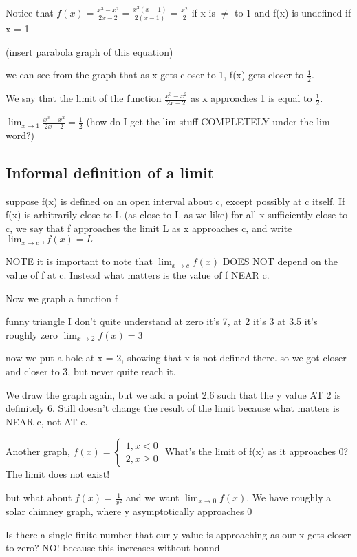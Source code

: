 \documentclass[12pt]{article}
\begin{document}
Notice that $f(x) = \frac{x^3-x^2}{2x-2} = \frac{x^2(x-1)}{2(x-1)} =
\frac{x^2}{2}$ if x is $\neq$ to 1
and f(x) is undefined if x = 1

(insert parabola graph of this equation)

we can see from the graph that as x gets closer to 1, f(x) gets closer
to $\frac{1}{2}$.

We say that the limit of the function $\frac{x^3-x^2}{2x-2}$ as
x approaches 1 is equal to $\frac{1}{2}$.

$\lim_{x \to 1} \frac{x^3-x^2}{2x-2} = \frac{1}{2}$ (how do I get the
lim stuff COMPLETELY under the lim word?)

\subsection{Informal definition of a limit}
suppose f(x) is defined on an open interval about c, except possibly
at c itself. If f(x) is arbitrarily close to L (as close to L as we
like) for all x sufficiently close to c, we say that f approaches the
limit L as x approaches c, and write $\lim_{x \to c}, f(x) = L $

NOTE it is important to note that $\lim_{x \to c} f(x)$
DOES NOT depend on the value of f at c.
Instead what matters is the value of f NEAR c.

Now we graph a function f

funny triangle I don't quite understand
at zero it's 7, at 2 it's 3 at 3.5 it's roughly zero
$\lim_{x \to 2} f(x) = 3$

now we put a hole at x = 2, showing that x is not defined there.
so we got closer and closer to 3, but never quite reach it.

We draw the graph again, but we add a point 2,6 such that the y value AT 2 is definitely 6. Still doesn't
change the result of the limit because what matters is NEAR c, not AT c.

Another graph,
$f(x) = \left\{ \begin{array}{l}
1, x < 0\\
2, x \geq 0 \end{array} \right. $
What's the limit of f(x) as it approaches 0? The limit does not exist!

but what about $f(x) = \frac{1}{x^2}$ and we want $\lim_{x \to 0} f(x)$.
We have roughly a solar chimney graph, where y asymptotically approaches 0

Is there a single finite number that our y-value is approaching as our x gets closer to zero? NO!
because this increases without bound
\end{document}
